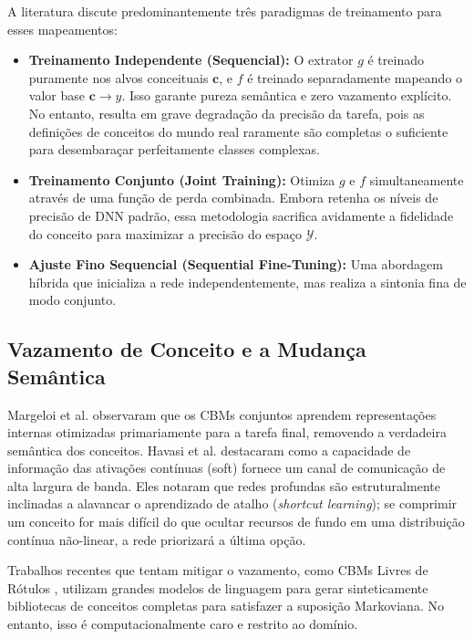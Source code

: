 \documentclass[times,twocolumn,final]{elsarticle}
\begin{document}
A literatura discute predominantemente três paradigmas de treinamento para esses mapeamentos:
\begin{itemize}
    \item \textbf{Treinamento Independente (Sequencial):} O extrator $g$ é treinado puramente nos alvos conceituais $\boldsymbol{c}$, e $f$ é treinado separadamente mapeando o valor base $\boldsymbol{c} \rightarrow y$. Isso garante pureza semântica e zero vazamento explícito. No entanto, resulta em grave degradação da precisão da tarefa, pois as definições de conceitos do mundo real raramente são completas o suficiente para desembaraçar perfeitamente classes complexas.
    \item \textbf{Treinamento Conjunto (Joint Training):} Otimiza $g$ e $f$ simultaneamente através de uma função de perda combinada. Embora retenha os níveis de precisão de DNN padrão, essa metodologia sacrifica avidamente a fidelidade do conceito para maximizar a precisão do espaço $\mathcal{Y}$.
    \item \textbf{Ajuste Fino Sequencial (Sequential Fine-Tuning):} Uma abordagem híbrida que inicializa a rede independentemente, mas realiza a sintonia fina de modo conjunto.
\end{itemize}

\subsection{Vazamento de Conceito e a Mudança Semântica}
Margeloi et al. \citep{margeloi2021do} observaram que os CBMs conjuntos aprendem representações internas otimizadas primariamente para a tarefa final, removendo a verdadeira semântica dos conceitos. Havasi et al. \citep{havasi2022addressing} destacaram como a capacidade de informação das ativações contínuas (soft) fornece um canal de comunicação de alta largura de banda. Eles notaram que redes profundas são estruturalmente inclinadas a alavancar o aprendizado de atalho (\textit{shortcut learning}); se comprimir um conceito for mais difícil do que ocultar recursos de fundo em uma distribuição contínua não-linear, a rede priorizará a última opção.

Trabalhos recentes que tentam mitigar o vazamento, como CBMs Livres de Rótulos \citep{oikarinen2023label}, utilizam grandes modelos de linguagem para gerar sinteticamente bibliotecas de conceitos completas para satisfazer a suposição Markoviana. No entanto, isso é computacionalmente caro e restrito ao domínio.
\end{document}
